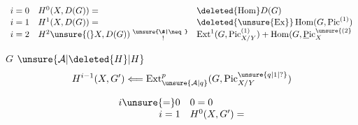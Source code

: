 \[
\begin{array}{rll}
i=0&H^0(X,D(G))=&\deleted{\operatorname{Hom}}D(G)\\
i=1&H^1(X,D(G))=&\deleted{\unsure{\operatorname{Ex}}}\operatorname{Hom}(G,\operatorname{Pic}^{(1)})\\
i=2&H^2\unsure{(}X,D(G))\mathrel{\substack{\unsure{\#|\neq}\\\hphantom{\#}!}}&
\operatorname{Ext}^1(G,\operatorname{Pic}^{(1)}_{X/Y})+
\operatorname{Hom}(G,\operatorname{\underline{P}ic}^{\unsure{(2}}_X
\end{array}
\]


\noindent $G$ \unsure{,}  $\unsure{\mathcal A|\deleted{H}|H}$
\[
H^{i-1}(X,G')\Longleftarrow
\operatorname{Ext}^{p}_{\unsure{\mathcal A|q}}(G,\operatorname{Pic}^{\unsure{q|1|?}}_{X/Y})
\]

\[
\begin{array}{rl}
i\unsure{=}0&0=0\\
i=1&H^0(X,G')=
\end{array}
\]
